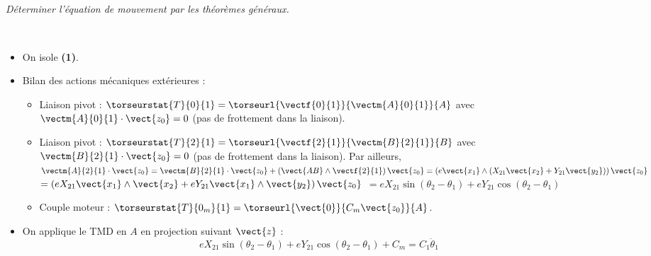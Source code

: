 \begin{multicols}{2}
\subparagraph{}
\textit{Déterminer l'équation de mouvement par les théorèmes généraux.}
\ifprof
\begin{corrige} ~\\
\begin{itemize}
\item On isole \textbf{(1)}.
\item Bilan des actions mécaniques extérieures :
\begin{itemize}
\item Liaison pivot : $\torseurstat{T}{0}{1}=\torseurl{\vectf{0}{1}}{\vectm{A}{0}{1}}{A}$ avec $\vectm{A}{0}{1}\cdot\vect{z_0}=0$ (pas de frottement dans la liaison).
\item Liaison pivot : $\torseurstat{T}{2}{1}=\torseurl{\vectf{2}{1}}{\vectm{B}{2}{1}}{B}$ avec $\vectm{B}{2}{1}\cdot\vect{z_0}=0$ (pas de frottement dans la liaison).
Par ailleurs, $\vectm{A}{2}{1}\cdot\vect{z_0}=\vectm{B}{2}{1}\cdot\vect{z_0}+\left(\vect{AB}\wedge\vectf{2}{1}\right) \vect{z_0}=\left(e\vect{x_1}\wedge\left(X_{21}\vect{x_2}+Y_{21}\vect{y_2}\right)\right)\vect{z_0}$
$=\left(eX_{21}\vect{x_1}\wedge \vect{x_2}+ eY_{21} \vect{x_1}\wedge \vect{y_2}\right)\vect{z_0} $
$=eX_{21}\sin \left( \theta_2 - \theta_1\right)+ eY_{21} \cos \left( \theta_2 - \theta_1\right) $

\item Couple moteur : $\torseurstat{T}{0_m}{1}=\torseurl{\vect{0}}{C_m\vect{z_0}}{A}$.
\end{itemize}
\item On applique le TMD en $A$ en projection suivant $\vect{z}$ :
$$
eX_{21}\sin \left( \theta_2 - \theta_1\right)+ eY_{21} \cos \left( \theta_2 - \theta_1\right) + C_m=C_1\ddot{\theta}_1
$$
\end{itemize}




\end{corrige}
\end{multicols}
